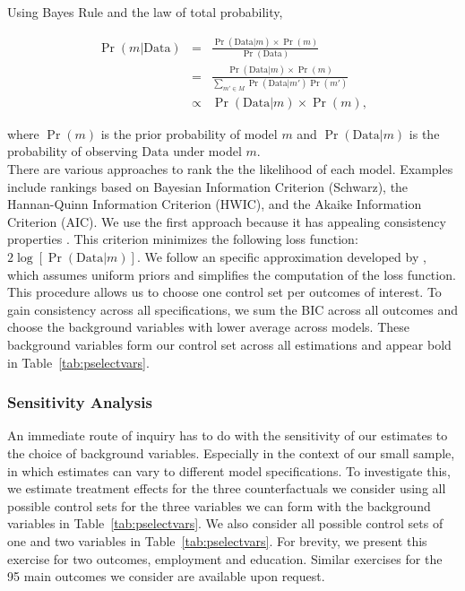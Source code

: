 \pagebreak
\noindent Using Bayes Rule and the law of total probability,

\begin{eqnarray}
\Pr( m | \text{Data} ) &=& \frac{\Pr(\text{Data} | m)\times \Pr(m)}{ \Pr(\text{Data})}\\ \nonumber
&=& \frac{\Pr(\text{Data} | m)\times \Pr(m)}{\sum \limits _{m' \in M} \Pr (\text{Data} | m') \Pr(m')} \\ \nonumber
&\propto& \Pr (\text{Data} | m) \times \Pr(m),
\end{eqnarray}

\noindent where $\Pr(m)$ is the prior probability of model $m$ and $\Pr(\text{Data} | m)$ is the probability of observing $\text{Data}$ under model $m$.\\

\noindent There are various approaches to rank the the likelihood of each model. Examples include rankings based on Bayesian Information Criterion (Schwarz), the Hannan-Quinn Information Criterion (HWIC), and the Akaike Information Criterion (AIC). We use the first approach because it has appealing consistency properties \citep{Diebold_2007_Forecasting}. This criterion minimizes the following loss function: $2 \log [\Pr( \text{Data} | m)]$. We follow an specific approximation developed by \citet{Claeskens-Hjort_2008_Model-Selection}, which assumes uniform priors and simplifies the computation of the loss function.\\

\noindent This procedure allows us to choose one control set per outcomes of interest. To gain consistency across all specifications, we sum the BIC across all outcomes and choose the background variables with lower average across models. These background variables form our control set across all estimations and appear bold in Table~\ref{tab:pselectvars}.

\subsubsection{Sensitivity Analysis}

\noindent An immediate route of inquiry has to do with the sensitivity of our estimates to the choice of background variables. Especially in the context of our small sample, in which estimates can vary to different model specifications. To investigate this, we estimate treatment effects for the three counterfactuals we consider using all possible control sets for the three variables we can form with the background variables in Table~\ref{tab:pselectvars}. We also consider all possible control sets of one and two variables in Table~\ref{tab:pselectvars}. For brevity, we present this exercise for two outcomes, employment and education. Similar exercises for the 95 main outcomes we consider are available upon request.\\


